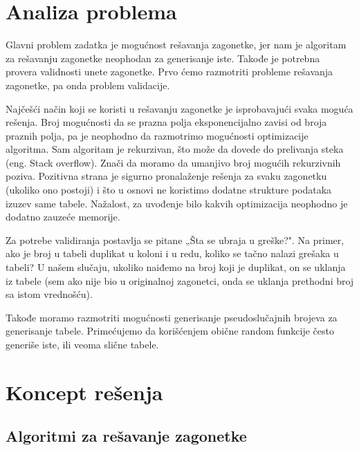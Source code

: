 \documentclass[a4paper]{article}
\begin{document}
    \section{Analiza problema}
    \par Glavni problem zadatka je mogućnost rešavanja zagonetke, jer nam je algoritam za rešavanju zagonetke neophodan za generisanje iste. Takođe je potrebna provera
    validnosti unete zagonetke. Prvo ćemo razmotriti probleme rešavanja zagonetke, pa onda problem validacije.
    \par Najčešći način koji se koristi u rešavanju zagonetke je isprobavajući svaka moguća rešenja. Broj mogućnosti da se prazna polja eksponencijalno zavisi od broja praznih polja, pa je
    neophodno da razmotrimo mogućnosti optimizacije algoritma. Sam algoritam je rekurzivan, što može da dovede do 
    prelivanja steka (eng. Stack overflow). Znači da moramo da umanjivo broj mogućih rekurzivnih poziva. Pozitivna strana je sigurno pronalaženje 
    rešenja za svaku zagonetku (ukoliko ono postoji) i što u osnovi ne koristimo dodatne strukture podataka izuzev same tabele. Nažalost, za uvođenje bilo kakvih optimizacija neophodno je
    dodatno zauzeće memorije.
    \par Za potrebe validiranja postavlja se pitane „Šta se ubraja u greške?". Na primer, ako je broj u tabeli duplikat u koloni i u redu, koliko se tačno nalazi grešaka u tabeli?
    U našem slučaju, ukoliko naiđemo na broj koji je duplikat, on se uklanja iz tabele (sem ako nije bio u originalnoj zagonetci, onda se uklanja prethodni broj sa istom vrednošću).
    \par Takođe moramo razmotriti mogućnosti generisanje pseudoslučajnih brojeva za generisanje tabele. Primećujemo da korišćenjem obične random funkcije često generiše iste,
    ili veoma slične tabele.
    \newpage

    \section{Koncept rešenja}
    
    \subsection{Algoritmi za rešavanje zagonetke}
\end{document}
